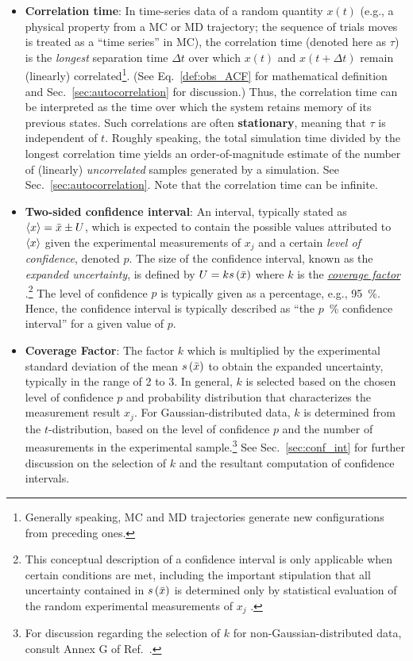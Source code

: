 \begin{itemize}
\item {\bf Correlation time}: In time-series data of a random quantity $x(t)$ (e.g., a physical property from a MC or MD trajectory; the sequence of trials moves is treated as a ``time series'' in MC), the correlation time (denoted here as $\tau$) is the {\it longest} separation time $\Delta t$ over which $x(t)$ and $x(t+\Delta t)$ remain (linearly) correlated\footnote{Generally speaking, MC and MD trajectories generate new configurations from preceding ones.}. (See Eq.~\ref{def:obs_ACF} for mathematical definition and Sec.~\ref{sec:autocorrelation} for discussion.)
Thus, the correlation time can be interpreted as the time over which the system retains memory of its previous states.
Such correlations are often {\bf stationary}, meaning that $\tau$ is independent of $t$.
Roughly speaking, the total simulation time divided by the longest correlation time yields an order-of-magnitude estimate of the number of (linearly) {\it uncorrelated} samples generated by a simulation. See Sec.~\ref{sec:autocorrelation}.  Note that the correlation time can be infinite.
\label{def:corr_time}

\item {\bf Two-sided confidence interval}: An interval, typically stated as $\langle x \rangle = \bar{x} \pm U$, which is expected to contain the possible values attributed to $\langle x \rangle$ given the experimental measurements of $x_j$ and a certain {\it level of confidence}, denoted $p$.
  The size of the confidence interval, known as the {\it expanded uncertainty}, is defined by $U = k s\left( \bar{x} \right)$ where $k$ is the \hyperref[def:coveragefactor]{\it coverage factor} \cite{JCGM:VIM2012}.\footnote{This conceptual description of a confidence interval is only applicable when certain conditions are met, including the important stipulation that all uncertainty contained in $s\left( \bar{x} \right)$ is determined only by statistical evaluation of the random experimental measurements of $x_j$ \cite{JCGM:GUM2008}.}
  The level of confidence $p$ is typically given as a percentage, e.g., 95~\%. Hence, the confidence interval is typically described as ``the $p$~\% confidence interval'' for a given value of $p$.
  \label{def:conf_int}

\item {\bf Coverage Factor}:
  The factor $k$ which is multiplied by the experimental standard deviation of the mean \hyperref[def:exp_st_dev_mean]{$s\left( \bar{x} \right)$} to obtain the expanded uncertainty, typically in the range of 2 to 3. In general, $k$ is selected based on the chosen level of confidence $p$ and probability distribution that characterizes the measurement result $x_j$. For Gaussian-distributed data, $k$ is determined from the $t$-distribution, based on the level of confidence $p$ and the number of measurements in the experimental sample.\footnote{For discussion regarding the selection of $k$ for non-Gaussian-distributed data, consult Annex G of Ref.~\cite{JCGM:GUM2008}.} See Sec.~\ref{sec:conf_int} for further discussion on the selection of $k$ and the resultant computation of confidence intervals.
  \label{def:coveragefactor}

\end{itemize}

